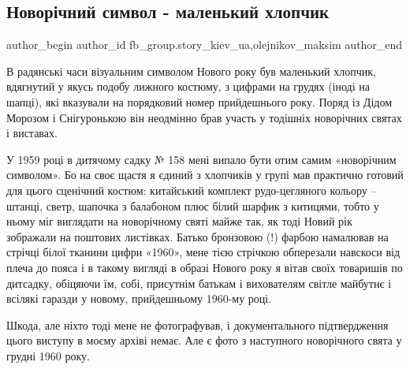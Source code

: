  
 
 
 
 
 
\subsection{Новорічний символ - маленький хлопчик}
\label{sec:27_12_2021.fb.fb_group.story_kiev_ua.2.novyj_god_malchik}
 
\ifcmt
 author_begin
   author_id fb_group.story_kiev_ua,olejnikov_maksim
 author_end
\fi

В радянські часи візуальним символом Нового року був маленький хлопчик,
вдягнутий у якусь подобу лижного костюму, з цифрами на грудях (іноді на шапці),
які вказували на порядковий номер прийдешнього року. Поряд із Дідом Морозом і
Снігуронькою він неодмінно брав участь у тодішніх новорічних святах і виставах.

У 1959 році в дитячому садку № 158 мені випало бути отим самим «новорічним
символом». Бо на своє щастя я єдиний з хлопчиків у групі мав практично готовий
для цього сценічний костюм: китайський комплект рудо-цегляного кольору –
штанці, светр, шапочка з балабоном плюс білий шарфик з китицями, тобто у ньому
міг виглядати на новорічному святі майже так, як тоді Новий рік зображали на
поштових листівках. Батько бронзовою (!) фарбою намалював на стрічці білої
тканини цифри «1960», мене тією стрічкою обперезали навскоси від плеча до пояса
і в такому вигляді в образі Нового року я вітав своїх товаришів по дитсадку,
обіцяючи їм, собі, присутнім батькам і вихователям  світле майбутнє і всілякі
гаразди у новому, прийдешньому 1960-му році. 

Шкода, але ніхто тоді мене не фотографував, і документального підтвердження
цього виступу в моєму архіві немає. Але є фото з наступного новорічного свята у
грудні 1960 року. 

\raggedcolumns
\begin{multicols}{3} %
\setlength{\parindent}{0pt}


\columnbreak


\end{multicols} %

